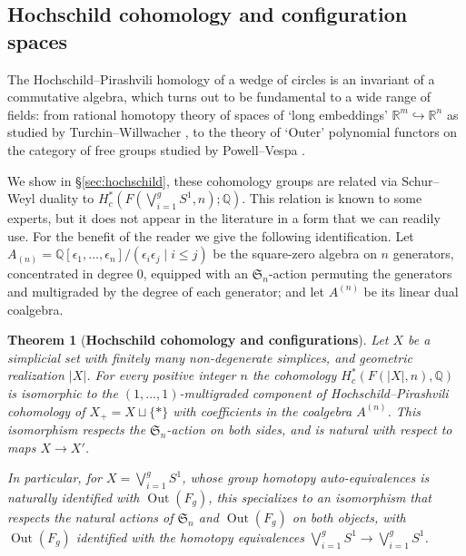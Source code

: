 \documentclass[12pt]{article}
\newcommand{\Q}{\mathbb{Q}}
\newcommand{\SymGroup}[1][n]{\mathfrak{S}_{#1}}
\newcommand{\into}{\hookrightarrow}
\DeclareMathOperator{\Out}{Out}
\theoremstyle{plain}
\newtheorem{thm}{Theorem}[section]
\theoremstyle{definition}
\theoremstyle{remark}
\begin{document}
\subsection{Hochschild cohomology and configuration spaces}

The Hochschild--Pirashvili homology of a wedge of circles is an invariant of a commutative algebra, which turns out to be fundamental to a wide range of fields: from rational homotopy theory of spaces of `long embeddings' $\mathbb{R}^m\into \mathbb{R}^n$ as studied by Turchin--Willwacher \cite{TW17}, to the theory of `Outer' polynomial functors on the category of free groups studied by Powell--Vespa \cite{PV18}.

We show in \S\ref{sec:hochschild}, these cohomology groups are related via Schur--Weyl duality to $H^*_c(F(\bigvee_{i=1}^g S^1,n);\Q)$. %
This relation is known to some experts, but it does not appear in the literature in a form that we can readily use. For the benefit of the reader we give the following identification. Let $A_{(n)} = \Q[\epsilon_1,\ldots,\epsilon_n]/(\epsilon_i\epsilon_j \mid i\leq j)$ be the square-zero algebra on $n$ generators, concentrated in degree $0$, equipped with an $\SymGroup$-action permuting the generators and multigraded by the degree of each generator; and let $A^{(n)}$ be its linear dual coalgebra.

\begin{thm}[\textbf{Hochschild cohomology and configurations}] \label{thm:hochschild and configurations}
Let $X$ be a simplicial set with finitely many non-degenerate simplices, and geometric realization $|X|$. For every positive integer $n$ the cohomology $H^*_c(F(|X|,n), \Q)$ is isomorphic to the $(1,\ldots,1)$-multigraded component of Hochschild--Pirashvili cohomology of $X_+ = X\sqcup \{*\}$ with coefficients in the coalgebra $A^{(n)}$. This isomorphism respects the $\SymGroup$-action on both sides, and is natural with respect to maps $X\to X'$.

In particular, for $X=\bigvee_{i=1}^g S^1$, whose group homotopy auto-equivalences is naturally identified with $\Out(F_g)$, this specializes to an isomorphism that respects the natural actions of $\SymGroup$ and $\Out(F_g)$ on both objects, with $\Out(F_g)$ identified with the homotopy equivalences $\bigvee_{i=1}^g S^1\to\bigvee_{i=1}^g S^1$.
\end{thm}
\end{document}
